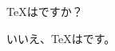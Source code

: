 \documentclass[dvipdfmx,a4paper]{jsarticle}
\begin{document}
{\TeX}はですか？
\par\bigskip
いいえ、{\TeX}はです。
\end{document}
